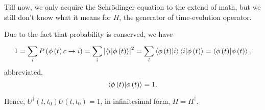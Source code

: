 
Till now, we only acquire the Schr\"odinger equation to the extend of math, but we still don't know what it means for $H$, the generator of time-evolution operator.

Due to the fact that probability is conserved, we have
\begin{equation}
  1 = \sum_{i}^{} P\left( \phi\left( t \right) c\to  i \right) = \sum_{i}^{} \left| \bra{i} \ket{\phi\left( t \right) } \right| ^{2} = \sum_{i}^{} \bra{\phi\left( t \right) } \ket{i} \bra{i} \ket{\phi\left( t \right) } = \bra{\phi\left( t \right) } \ket{\phi\left( t \right) }, 
\end{equation}
abbreviated, 
\begin{equation}
    \braket{\phi\left( t \right) }{\phi\left( t \right) } = 1.
\end{equation}

Hence, $U^{\dagger}\left( t,t_0 \right) U\left( t,t_0 \right) = 1$, in infinitesimal form, $H = H^{\dagger}$.